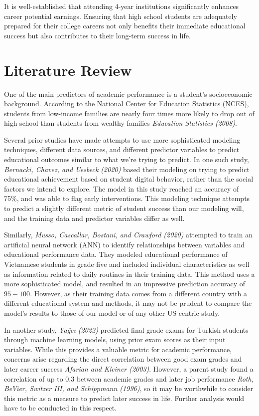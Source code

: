 \documentclass[
  man,floatsintext]{apa6}
\begin{document}
It is well-established that attending 4-year institutions significantly enhances career potential earnings. Ensuring that high school students are adequately prepared for their college careers not only benefits their immediate educational success but also contributes to their long-term success in life.

\hypertarget{literature-review}{%
\section{Literature Review}\label{literature-review}}

One of the main predictors of academic performance is a student's socioeconomic background. According to the National Center for Education Statistics (NCES), students from low-income families are nearly four times more likely to drop out of high school than students from wealthy families \emph{Education Statistics (2008)}.

Several prior studies have made attempts to use more sophisticated modeling techniques, different data sources, and different predictor variables to predict educational outcomes similar to what we're trying to predict. In one such study, \emph{Bernacki, Chavez, and Uesbeck (2020)} based their modeling on trying to predict educational achievement based on student digital behavior, rather than the social factors we intend to explore. The model in this study reached an accuracy of 75\%, and was able to flag early interventions. This modeling technique attempts to predict a slightly different metric of student success than our modeling will, and the training data and predictor variables differ as well.

Similarly, \emph{Musso, Cascallar, Bostani, and Crawford (2020)} attempted to train an artificial neural network (ANN) to identify relationships between variables and educational performance data. They modeled educational performance of Vietnamese students in grade five and included individual characteristics as well as information related to daily routines in their training data. This method uses a more sophisticated model, and resulted in an impressive prediction accuracy of \(95-100%
\). However, as their training data comes from a different country with a different educational system and methods, it may not be prudent to compare the model's results to those of our model or of any other US-centric study.

In another study, \emph{Yağcı (2022)} predicted final grade exams for Turkish students through machine learning models, using prior exam scores as their input variables. While this provides a valuable metric for academic performance, concerns arise regarding the direct correlation between good exam grades and later career success \emph{Afarian and Kleiner (2003)}. However, a parent study found a correlation of up to 0.3 between academic grades and later job performance \emph{Roth, BeVier, Switzer III, and Schippmann (1996)}, so it may be worthwhile to consider this metric as a measure to predict later success in life. Further analysis would have to be conducted in this respect.
\end{document}
